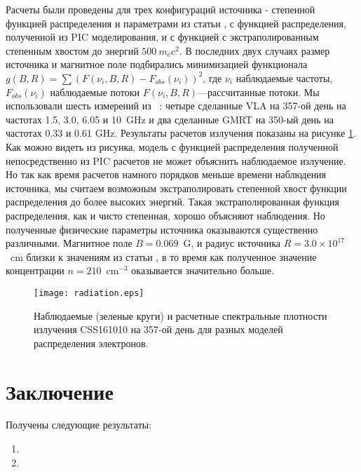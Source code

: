 Расчеты были проведены для трех конфигураций источника - степенной функцией распределения и параметрами из статьи \cite{Coppejans2020}, с функцией распределения, полученной из PIC моделирования, и с функцией с экстраполированным степенным хвостом до энергий $\displaystyle 500~m_{e} c^{2}$. В последних двух случаях размер источника и магнитное поле подбирались минимизацией функционала $\displaystyle g(B,R) = \sum (F(\nu_{i}, B, R) - F_{obs}(\nu_{i}))^{2}$, где $\nu_i$ 
наблюдаемые частоты, $\displaystyle F_{obs}(\nu_{i})$ наблюдаемые потоки
$\displaystyle F(\nu_{i}, B, R)$---рассчитанные потоки.
Мы использовали шесть измерений из ~\cite{Coppejans2020}: четыре сделанные VLA на 357-ой день
на частотах 1.5, 3.0, 6.05 и 10~GHz и два сделанные GMRT на 350-ый день на частотах 0.33 и 0.61 GHz. Результаты расчетов излучения показаны на рисунке \ref{radiation}.
Как можно видеть из рисунка, модель с функцией распределения полученной непосредственно из PIC расчетов не может объяснить наблюдаемое излучение. Но так как время расчетов намного порядков меньше времени наблюдения источника, мы считаем возможным экстраполировать степенной хвост функции распределения до более высоких энергий. Такая экстраполированная функция распределения, как и чисто степенная, хорошо объясняют наблюдения. Но полученные физические параметры источника оказываются существенно различными. Магнитное поле $\displaystyle B = 0.069$~G, и радиус источника $\displaystyle R = 3.0 \times
10^{17}$~cm близки к значениям из статьи \cite{Coppejans2020}, в то время как полученное значение концентрации $\displaystyle n = 210$~cm$^{-3}$ оказывается значительно больше.
\begin{figure}
	\centering
	\texttt{[image: radiation.eps]} 
	\caption{Наблюдаемые 
		(зеленые круги) и расчетные спектральные плотности излучения CSS161010  на 357-ой день для разных моделей распределения электронов.} 
	\label{radiation} 
\end{figure} 


\FloatBarrier
\section{Заключение}
 

Получены следующие результаты:
\begin{enumerate}
\item 
\item 
\end{enumerate}


\clearpage